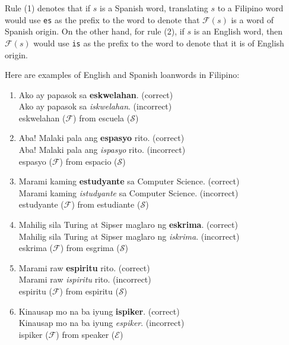 Rule (1) denotes that if \(s\) is a Spanish word, translating \(s\) to a Filipino
word would use \texttt{es} as the prefix to the word to denote that \(\mathcal{F}(s)\)
is a word of Spanish origin. On the other hand, for rule (2), if \(s\) is an
English word, then \(\mathcal{F}(s)\) would use \texttt{is} as the prefix to the word
to denote that it is of English origin.

\begin{example}
      Here are examples of English and Spanish loanwords in Filipino:
\end{example}
\begin{enumerate}
      \item Ako ay papasok sa \textbf{eskwelahan}. (correct) \\
            Ako ay papasok sa \textit{iskwelahan}. (incorrect) \\
            eskwelahan (\(\mathcal{F}\)) from escuela (\(\mathcal{S}\))
      \item Aba! Malaki pala ang \textbf{espasyo} rito. (correct) \\
            Aba! Malaki pala ang \textit{ispasyo} rito. (incorrect) \\
            espasyo (\(\mathcal{F}\)) from espacio (\(\mathcal{S}\))
      \item Marami kaming \textbf{estudyante} sa Computer Science. (correct) \\
            Marami kaming \textit{istudyante} sa Computer Science. (incorrect)\\
            estudyante (\(\mathcal{F}\)) from estudiante (\(\mathcal{S}\))
      \item Mahilig sila Turing at Sipser maglaro ng \textbf{eskrima}. (correct) \\
            Mahilig sila Turing at Sipser maglaro ng \textit{iskrima}. (incorrect) \\
            eskrima  (\(\mathcal{F}\)) from esgrima (\(\mathcal{S}\))
      \item Marami raw \textbf{espiritu} rito. (correct) \\
            Marami raw \textit{ispiritu} rito. (incorrect) \\
            espiritu (\(\mathcal{F}\)) from espiritu (\(\mathcal{S}\))
      \item Kinausap mo na ba iyung \textbf{ispiker}. (correct) \\
            Kinausap mo na ba iyung \textit{espiker}. (incorrect) \\
            ispiker (\(\mathcal{F}\)) from speaker (\(\mathcal{E}\))

\end{enumerate}
